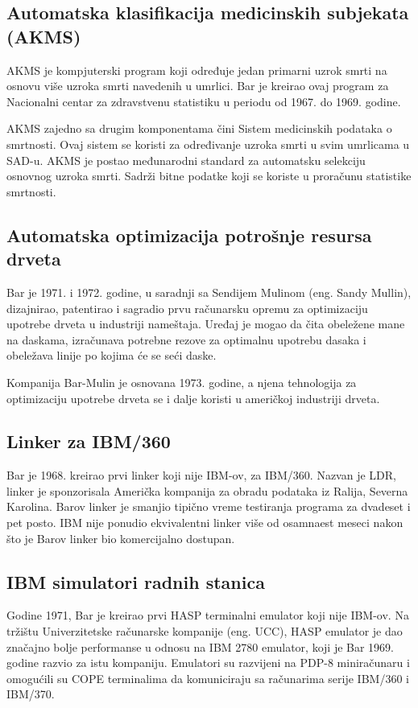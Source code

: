 \documentclass[a4paper]{article}
\begin{document}
{		\subsection{Automatska klasifikacija medicinskih subjekata (AKMS)}
		AKMS je kompjuterski program koji određuje jedan primarni uzrok smrti na osnovu više uzroka smrti navedenih u umrlici. Bar je kreirao ovaj program za Nacionalni centar za zdravstvenu statistiku u periodu od 1967. do 1969. godine.
		
		AKMS zajedno sa drugim komponentama čini Sistem medicinskih podataka o smrtnosti. Ovaj sistem se koristi za određivanje uzroka smrti u svim umrlicama u SAD-u. AKMS je postao međunarodni standard za automatsku selekciju osnovnog uzroka smrti. Sadrži bitne podatke koji se koriste u proračunu statistike smrtnosti.
		
		\subsection{Automatska optimizacija potrošnje resursa drveta}
		Bar je 1971. i 1972. godine, u saradnji sa Sendijem Mulinom (eng. Sandy Mullin), dizajnirao, patentirao i sagradio prvu računarsku opremu za optimizaciju upotrebe drveta u industriji nameštaja. Uređaj je mogao da čita obeležene mane na daskama, izračunava potrebne rezove za optimalnu upotrebu dasaka i obeležava linije po kojima će se seći daske.
		
		Kompanija Bar-Mulin je osnovana 1973. godine, a njena tehnologija za optimizaciju upotrebe drveta se i dalje koristi u američkoj industriji drveta. 
		
		\subsection{Linker za IBM/360}
		Bar je 1968. kreirao prvi linker koji nije IBM-ov, za IBM/360. Nazvan je LDR, linker je sponzorisala Američka kompanija za obradu podataka iz Ralija, Severna Karolina. Barov linker je smanjio tipično vreme testiranja programa za dvadeset i pet posto. IBM nije ponudio ekvivalentni linker više od osamnaest meseci nakon što je Barov linker bio komercijalno dostupan.
		
		\subsection{IBM simulatori radnih stanica}
		Godine 1971, Bar je kreirao prvi HASP terminalni emulator koji nije IBM-ov. Na tržištu Univerzitetske računarske kompanije (eng. UCC), HASP emulator je dao značajno bolje performanse u odnosu na IBM 2780 emulator, koji je Bar 1969. godine razvio za istu kompaniju. Emulatori su razvijeni na PDP-8 miniračunaru i omogućili su COPE terminalima da komuniciraju sa računarima serije IBM/360 i IBM/370.
		
}
\end{document}

